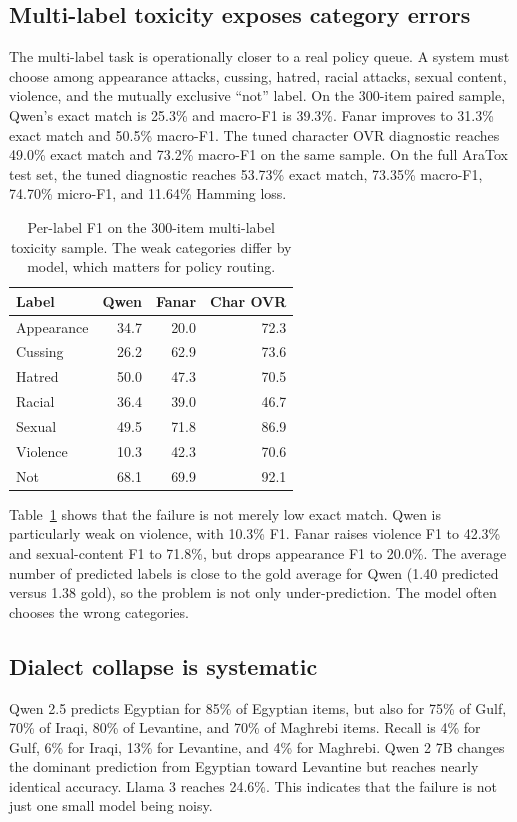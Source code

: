 \documentclass[10pt,twocolumn]{article}
\begin{document}
\subsection{Multi-label toxicity exposes category errors}
The multi-label task is operationally closer to a real policy queue. A system
must choose among appearance attacks, cussing, hatred, racial attacks, sexual
content, violence, and the mutually exclusive ``not'' label. On the 300-item
paired sample, Qwen's exact match is 25.3\% and macro-F1 is 39.3\%. Fanar
improves to 31.3\% exact match and 50.5\% macro-F1. The tuned character OVR
diagnostic reaches 49.0\% exact match and 73.2\% macro-F1 on the same sample.
On the full AraTox test set, the tuned diagnostic reaches 53.73\% exact match,
73.35\% macro-F1, 74.70\% micro-F1, and 11.64\% Hamming loss.

\begin{table}[t]
\centering
\small
\caption{Per-label F1 on the 300-item multi-label toxicity sample. The weak
categories differ by model, which matters for policy routing.}
\label{tab:perlabel}
\begin{tabular}{lrrr}
\toprule
Label & Qwen & Fanar & Char OVR \\
\midrule
Appearance & 34.7 & 20.0 & 72.3 \\
Cussing & 26.2 & 62.9 & 73.6 \\
Hatred & 50.0 & 47.3 & 70.5 \\
Racial & 36.4 & 39.0 & 46.7 \\
Sexual & 49.5 & 71.8 & 86.9 \\
Violence & 10.3 & 42.3 & 70.6 \\
Not & 68.1 & 69.9 & 92.1 \\
\bottomrule
\end{tabular}
\end{table}

Table~\ref{tab:perlabel} shows that the failure is not merely low exact match.
Qwen is particularly weak on violence, with 10.3\% F1. Fanar raises violence
F1 to 42.3\% and sexual-content F1 to 71.8\%, but drops appearance F1 to
20.0\%. The average number of predicted labels is close to the gold average
for Qwen (1.40 predicted versus 1.38 gold), so the problem is not only
under-prediction. The model often chooses the wrong categories.

\subsection{Dialect collapse is systematic}
Qwen 2.5 predicts Egyptian for 85\% of Egyptian items, but also for 75\% of
Gulf, 70\% of Iraqi, 80\% of Levantine, and 70\% of Maghrebi items. Recall is
4\% for Gulf, 6\% for Iraqi, 13\% for Levantine, and 4\% for Maghrebi. Qwen 2
7B changes the dominant prediction from Egyptian toward Levantine but reaches
nearly identical accuracy. Llama 3 reaches 24.6\%. This indicates that the
failure is not just one small model being noisy.
\end{document}
